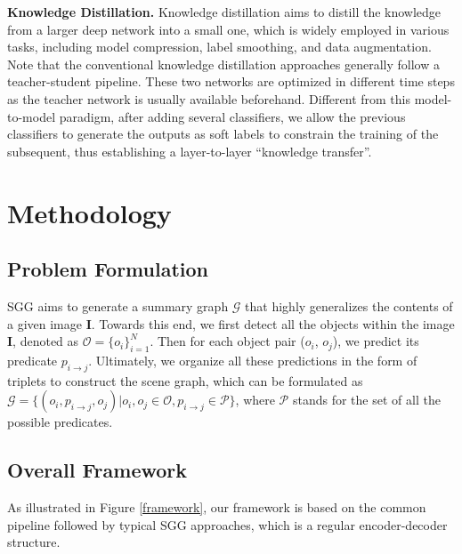 \documentclass[10pt,twocolumn,letterpaper]{article}
\begin{document}
\noindent\textbf{Knowledge Distillation.} Knowledge distillation\cite{gou2021knowledge,hinton2015distilling,mirzadeh2020improved} aims to distill the knowledge from a larger deep network into
a small one, which is widely employed in various tasks, including model compression\cite{wang2019private, bai2020few}, label smoothing\cite{yuan2020revisiting, shen2021label}, and data augmentation\cite{gordon2019explaining, feng2021learning}. Note that the conventional knowledge distillation approaches generally follow a teacher-student pipeline. These two networks are optimized in different time steps as the teacher network is usually available beforehand. Different from this model-to-model paradigm, after adding several classifiers, we allow the previous classifiers to generate the outputs as soft labels to constrain the training of the subsequent, thus establishing a layer-to-layer ``knowledge transfer''.



\section{Methodology}

\subsection{Problem Formulation} 
\label{Sec31}
SGG aims to generate a summary graph $\mathcal{G}$ that highly generalizes the contents of a given image $\boldsymbol{I}$. Towards this end, we first detect all the objects within the image $\boldsymbol{I}$, denoted as $\mathcal{O}=\{o_{i}\}_{i=1}^N$. Then for each object pair ($o_{i}$, $o_{j}$), we predict its predicate $p_{i\rightarrow j}$. Ultimately, we organize all these predictions in the form of triplets to construct the scene graph, which can be formulated as $\mathcal{G} = \{(o_i,p_{i\rightarrow j},o_j)|o_i, o_j\in \mathcal{O}, p_{i\rightarrow j}\in \mathcal{P}\}$, where $\mathcal{P}$ stands for the set of all the possible predicates.

\subsection{Overall Framework}
\label{Sec32}
As illustrated in Figure \ref{framework}, our framework is based on the common pipeline followed by typical SGG  approaches\cite{zellers2018neural,tang2019learning,yan2020pcpl,yu2020cogtree}, which is a regular encoder-decoder structure.
\end{document}
